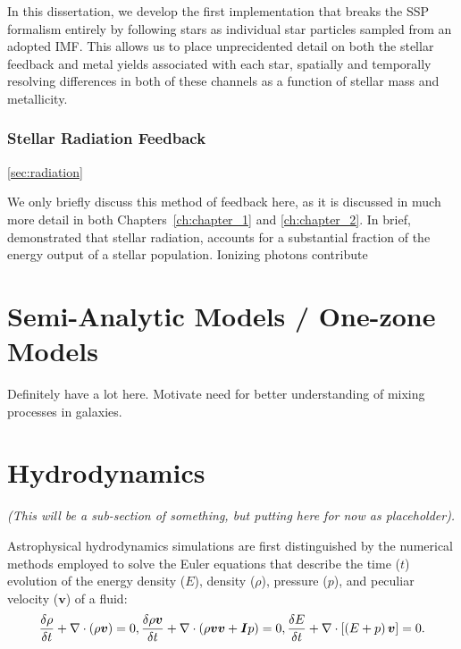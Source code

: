 In this dissertation, we develop the first implementation that breaks the SSP formalism entirely by following stars as individual star particles sampled from an adopted IMF. This allows us to place unprecidented detail on both the stellar feedback and metal yields associated with each star, spatially and temporally resolving differences in both of these channels as a function of stellar mass and metallicity.

\subsubsection{Stellar Radiation Feedback}
\ref{sec:radiation}

We only briefly discuss this method of feedback here, as it is discussed in much more detail in both Chapters~\ref{ch:chapter_1} and \ref{ch:chapter_2}. In brief, \cite{Agertz2013} demonstrated that stellar radiation, accounts for a substantial fraction of the energy output of a stellar population. Ionizing photons contribute 

\section{Semi-Analytic Models / One-zone Models}

Definitely have a lot here. Motivate need for better understanding of mixing processes in galaxies. \citep{SchonrichWeinberg2019}


\section{Hydrodynamics}
\textit{(This will be a sub-section of something, but putting here for now as placeholder).}

Astrophysical hydrodynamics simulations are first distinguished by the numerical methods employed to solve the Euler equations that describe the time ($t$) evolution of the energy density ($E$), density ($\rho$), pressure ($p$), and peculiar velocity ($\bm{v}$) of a fluid:
\begin{equation}
  \frac{\delta \rho}{\delta t} + \nabla \cdot \left(\rho \bm{v}\right)  = 0,\\
  \frac{\delta \rho \bm{v}}{\delta t} + \nabla \cdot \left(\rho \bm{v}\bm{v} + \bm{I}p \right) = 0,\\
  \frac{\delta E}{\delta t} + \nabla \cdot \left[\left(E +p\right)\bm{v}\right] = 0.
\end{equation}

